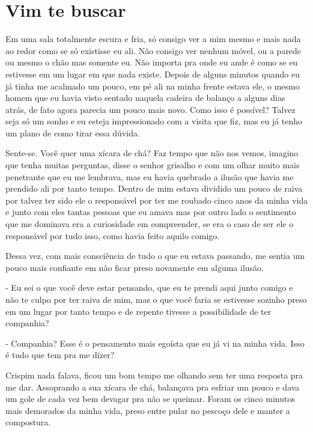 
\newpage

\chapter{Vim te buscar}



Em uma sala totalmente escura e fria, só consigo ver a mim mesmo e mais nada ao redor como se só existisse eu ali. Não consigo ver nenhum móvel, ou a parede ou mesmo o chão mas somente eu. Não importa pra onde eu ande é como se eu estivesse em um lugar em que nada existe. Depois de alguns minutos quando eu já tinha me acalmado um pouco, em pé ali na minha frente estava ele, o mesmo homem que eu havia visto sentado naquela cadeira de balanço a alguns dias atrás, de fato agora parecia um pouco mais novo. Como isso é possível? Talvez seja só um sonho e eu esteja impressionado com a visita que fiz, mas eu já tenho um plano de como tirar essa dúvida.

Sente-se. Você quer uma xícara de chá? Faz tempo que não nos vemos, imagino que tenha muitas perguntas, disse o senhor grisalho e com um olhar muito mais penetrante que eu me lembrava, mas eu havia quebrado a ilusão que havia me prendido ali por tanto tempo. Dentro de mim estava dividido um pouco de raiva por talvez ter sido ele o responsável por ter me roubado cinco anos da minha vida e junto com eles tantas pessoas que eu amava mas por outro lado o sentimento que me dominava era a curiosidade em compreender, se era o caso de ser ele o responsável por tudo isso, como havia feito aquilo comigo.

Dessa vez, com mais consciência de tudo o que eu estava passando, me sentia um pouco mais confiante em não ficar preso novamente em alguma ilusão.

- Eu sei o que você deve estar pensando, que eu te prendi aqui junto comigo e não te culpo por ter raiva de mim, mas o que você faria se estivesse sozinho preso em um lugar por tanto tempo e de repente tivesse a possibilidade de ter companhia?

- Companhia? Esse é o pensamento mais egoísta que eu já vi na minha vida. Isso é tudo que tem pra me dizer?

Crispim nada falava, ficou um bom tempo me olhando sem ter uma resposta pra me dar. Assoprando a sua xícara de chá, balançava pra esfriar um pouco e dava um gole de cada vez bem devagar pra não se queimar. Foram os cinco minutos mais demorados da minha vida, preso entre pular no pescoço dele e manter a compostura.

